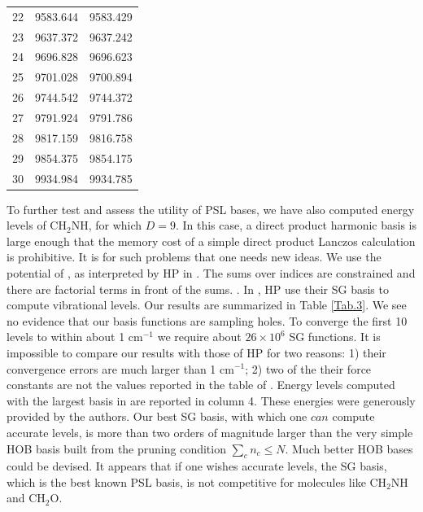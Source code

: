 \begin{table}
\begin{small}
\begin{tabular}{|l | r | r | }
 22    &  9583.644 & 9583.429\\                   
 23    &  9637.372 & 9637.242\\                   
 24    &  9696.828 & 9696.623\\                   
 25    &  9701.028 & 9700.894\\                   
 26    &  9744.542 & 9744.372\\
 27    &  9791.924 & 9791.786\\                   
 28    &  9817.159 & 9816.758\\                   
 29    &  9854.375 & 9854.175\\                   
 30    &  9934.984 & 9934.785\\
    \hline                
\end{tabular} 
\end{small}
\end{table}




To further test  and assess the utility of PSL bases, we have also computed energy levels of  CH$_2$NH, for which $D=9$.  In this case, 
a direct product harmonic basis is large enough that the memory cost of a simple direct product Lanczos calculation is prohibitive.   It is for such 
problems that one needs new ideas.  
We use the  potential of   ,  as interpreted by HP in        .    The sums over indices are constrained and there are factorial terms in 
front of the sums.   
  \cite{Halverson2014}.  In  , HP use their SG basis to compute vibrational levels.   
Our results are summarized  in  Table \ref{Tab.3}. 
%
We see no evidence that our basis functions are sampling holes. 
 To converge the first 10 levels to within about 1  cm$^{-1}$ we require about $26 \times 10^6$ SG functions.  
%
It is impossible to compare our results with those of HP for two reasons:  1)   their convergence errors  are  much larger than  1  cm$^{-1}$; 2) two of the their force constants
are not the values reported in the table of     .\cite{Halverson_priv}   
%
%
Energy levels computed with the largest basis in    are reported in column 4.    
These energies were generously provided by the authors.   
%
% 
Our best SG basis, with which one $can$ compute accurate levels,  is  more than two orders of magnitude 
larger than the very simple HOB basis built  from the pruning condition $\sum_c n_c \le N$.  Much better HOB bases could be devised.  
It appears that if  one wishes accurate levels, the SG basis, which is the best known PSL basis, is not competitive for molecules like   CH$_2$NH and 
 CH$_2$O.   


